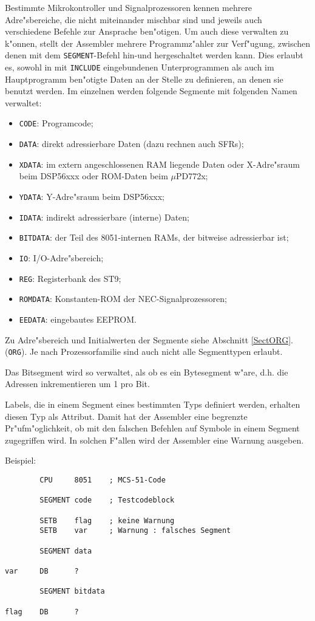 \documentclass[12pt,a4paper,twoside]{report}
\newcommand{\tty}[1]{{\tt #1}}
\begin{document}
Bestimmte Mikrokontroller und Signalprozessoren kennen mehrere
Adre"sbereiche, die nicht miteinander mischbar sind und jeweils auch
verschiedene Befehle zur Ansprache ben"otigen.  Um auch diese verwalten zu
k"onnen, stellt der Assembler mehrere Programmz"ahler zur Verf"ugung,
zwischen denen mit dem
\tty{SEGMENT}-Befehl hin-und hergeschaltet werden kann.  Dies erlaubt es,
sowohl in mit \tty{INCLUDE} eingebundenen Unterprogrammen als auch im
Hauptprogramm ben"otigte Daten an der Stelle zu definieren, an denen
sie benutzt werden.  Im einzelnen werden folgende Segmente mit folgenden
Namen verwaltet:
\begin{itemize}
\item{\tty{CODE}: Programcode;}
\item{\tty{DATA}: direkt adressierbare Daten (dazu rechnen auch SFRs);}
\item{\tty{XDATA}: im extern angeschlossenen RAM liegende Daten oder
             X-Adre"sraum beim DSP56xxx oder ROM-Daten beim $\mu$PD772x;}
\item{\tty{YDATA}: Y-Adre"sraum beim DSP56xxx;}
\item{\tty{IDATA}: indirekt adressierbare (interne) Daten;}
\item{\tty{BITDATA}: der Teil des 8051-internen RAMs, der bitweise
      adressierbar ist;}
\item{\tty{IO}: I/O-Adre"sbereich;}
\item{\tty{REG}: Registerbank des ST9;}
\item{\tty{ROMDATA}: Konstanten-ROM der NEC-Signalprozessoren;}
\item{\tty{EEDATA}: eingebautes EEPROM.}
\end{itemize}
Zu Adre"sbereich und Initialwerten der Segmente siehe Abschnitt \ref{SectORG}.
(\tty{ORG}).  Je nach Prozessorfamilie sind auch nicht alle Segmenttypen
erlaubt.
\par
Das Bitsegment wird so verwaltet, als ob es ein Bytesegment w"are,
d.h. die Adressen inkrementieren um 1 pro Bit.
\par
Labels, die in einem Segment eines bestimmten Typs definiert werden,
erhalten diesen Typ als Attribut.  Damit hat der Assembler eine
begrenzte Pr"ufm"oglichkeit, ob mit den falschen Befehlen auf Symbole
in einem Segment zugegriffen wird.  In solchen F"allen wird der
Assembler eine Warnung ausgeben.
\par
Beispiel:
\begin{verbatim}
        CPU     8051    ; MCS-51-Code

        SEGMENT code    ; Testcodeblock

        SETB    flag    ; keine Warnung
        SETB    var     ; Warnung : falsches Segment

        SEGMENT data

var     DB      ?

        SEGMENT bitdata

flag    DB      ?
\end{verbatim}
\end{document}
